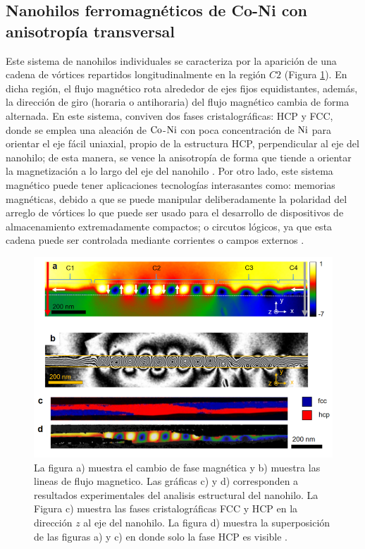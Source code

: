 \subsection{Nanohilos ferromagnéticos de Co-Ni con anisotropía transversal}
Este sistema de nanohilos individuales se caracteriza por la aparición de una cadena de vórtices repartidos longitudinalmente en la región $C2$ (Figura \ref{fig:ExoticVortexNW}). En dicha región, el flujo magnético rota alrededor de ejes fijos equidistantes, además, la dirección de giro (horaria o antihoraria) del flujo magnético cambia de forma alternada. En este sistema, conviven dos fases cristalográficas: HCP y FCC, donde se emplea una aleación de $\ce{Co}$-$\ce{Ni}$ con poca concentración de $\ce{Ni}$ para orientar el eje fácil uniaxial, propio de la estructura HCP, perpendicular al eje del nanohilo; de esta manera, se vence la anisotropía de forma que tiende a orientar la magnetización a lo largo del eje del nanohilo \cite{ExoticMagneticConfiguration}. Por otro lado, este sistema magnético puede tener aplicaciones tecnologías interasantes como: memorias magnéticas, debido a que se puede manipular deliberadamente la polaridad del arreglo de vórtices lo que puede ser usado para el desarrollo de dispositivos de almacenamiento extremadamente compactos; o circutos lógicos, ya que esta cadena puede ser controlada mediante corrientes o campos externos \cite{FieldTuneble}.
\begin{figure}[!hpt]
    \centering
    \includegraphics[scale=0.7]{Figuras/ExoticVortexNW.png}
    \renewcommand{\figurename}{\textbf{Figura}}
    \renewcommand\thefigure{\textbf{\arabic{figure}}}
    \caption{La figura a) muestra el cambio de fase magnética y b) muestra las lineas de flujo magnetico. Las gráficas c) y d) corresponden a resultados experimentales del analisis estructural del nanohilo. La Figura c) muestra las fases cristalográficas FCC y HCP en la dirección $z$ al eje del nanohilo. La figura d) muestra la superposición de las figuras a) y c) en donde solo la fase HCP es visible \cite{ExoticMagneticConfiguration}.}
    \label{fig:ExoticVortexNW}
\end{figure}